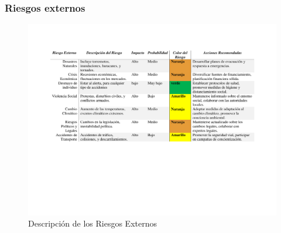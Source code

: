     \subsubsection{Riesgos externos}
    \begin{figure}[H]
        \centering
        \includegraphics[trim = {20mm 80mm 20mm 26mm},clip,scale=0.35]{1/img/Riesgo Externo.pdf}
        \caption{Descripción de los Riesgos Externos}
    \end{figure}
